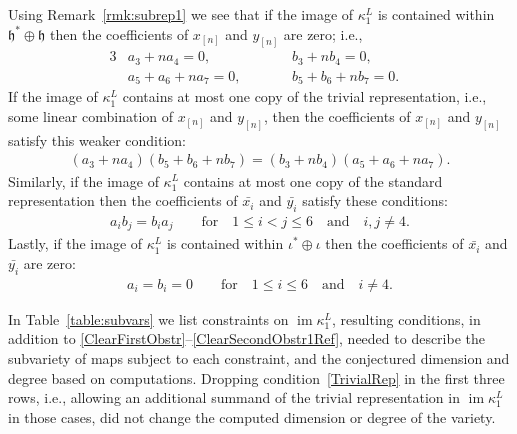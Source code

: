 \documentclass[pdftex]{sigma}
\numberwithin{equation}{section}
\DeclareMathOperator{\im}{im}
\begin{document}
Using Remark~\ref{rmk:subrep1} we see that if the image of $\kappa^L_1$ is contained within $\mathfrak{h}^*\oplus \mathfrak{h}$
then the coefficients of $x_{[n]}$ and $y_{[n]}$ are zero;
i.e.,
\begin{alignat}{3}
\label{DoubledStdRepa}
& a_3+na_4=0, \qquad && b_3+nb_4=0,& \\
\label{DoubledStdRepb}
& a_5+a_6+na_7=0, \qquad && b_5+b_6+nb_7=0.&
\end{alignat}
If the image of $\kappa^L_1$ contains at most one copy of the trivial representation,
i.e., some linear combination of $x_{[n]}$ and $y_{[n]}$, then the coefficients of
$x_{[n]}$ and $y_{[n]}$ satisfy this weaker condition:
\begin{gather}\label{TrivialRep}
(a_3+na_4)(b_5+b_6+nb_7)=(b_3+nb_4)(a_5+a_6+na_7).
\end{gather}
Similarly, if the image of $\kappa^L_1$ contains at most one copy of the standard representation
then the coefficients of $\bar{x_i}$ and $\bar{y_i}$ satisfy these conditions:
\begin{gather}\label{StdRep}
a_i b_j=b_i a_j \qquad \text{for}\quad 1\leq i<j \leq 6\quad \text{and}\quad i,j \neq 4.
\end{gather}
Lastly, if the image of $\kappa^L_1$ is contained within $\iota^* \oplus \iota$
then the coefficients of $\bar{x_i}$ and $\bar{y_i}$ are zero:
\begin{gather}\label{DoubledTrivialRep}
a_i=b_i=0 \qquad \text{for}\quad 1\leq i \leq 6 \quad\text{and}\quad i \neq 4.
\end{gather}

In Table~\ref{table:subvars} we list constraints on $\im \kappa^L_1$,
resulting conditions, in addition to \eqref{ClearFirstObstr}--\eqref{ClearSecondObstr1Ref},
needed to describe the subvariety of maps subject to each constraint,
and the conjectured dimension and degree based on computations.
Dropping condition~\eqref{TrivialRep} in the first three rows, i.e., allowing an additional summand of the trivial representation in $\im \kappa^L_1$ in those cases, did not change the computed dimension or degree of the variety.
\end{document}
